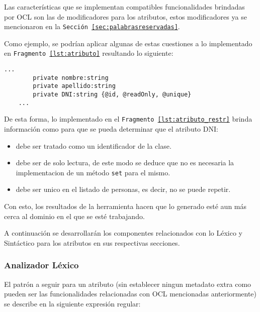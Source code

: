Las características que se implementan compatibles funcionalidades brindadas
por OCL son las de modificadores para los atributos, estos modificadores ya
se mencionaron en la \texttt{Sección \ref{sec:palabrasreservadas}}.

Como ejemplo, se podrían aplicar algunas de estas cuestiones a lo implementado
en \texttt{Fragmento \ref{lst:atributo}} resultando lo siguiente:

\begin{lstlisting}[caption={Director - Modelao de atributos (con OCL)},
label=lst:atributo_restr]
  ...
		private nombre:string
		private apellido:string
		private DNI:string {@id, @readOnly, @unique}
	...
\end{lstlisting}

De esta forma, lo implementado en el \texttt{Fragmento
\ref{lst:atributo_restr}} brinda información como para que se pueda determinar
que el atributo DNI:
\begin{itemize}
	\item debe ser tratado como un identificador de la clase.
	\item debe ser de solo lectura, de este modo se deduce que no es necesaria la
		implementacion de un método \texttt{set} para el mismo.
	\item debe ser unico en el listado de personas, es decir, no se puede
		repetir.
\end{itemize}

Con esto, los resultados de la herramienta hacen que lo generado esté aun
más cerca al dominio en el que se esté trabajando.

A continuación se desarrollarán los componentes relacionados con lo Léxico y
Sintáctico para los atributos en sus respectivas secciones.

\subsubsection{Analizador Léxico}

El patrón a seguir para un atributo (sin establecer ningun metadato extra como
pueden ser las funcionalidades relacionadas con OCL mencionadas anteriormente) se describe en la siguiente expresión regular:

